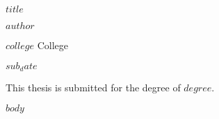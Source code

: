 \documentclass{book}
\begin{document}
$title$

$author$

$college$ College

$sub_date$

This thesis is submitted for the degree of $degree$.


$body$
\end{document}
